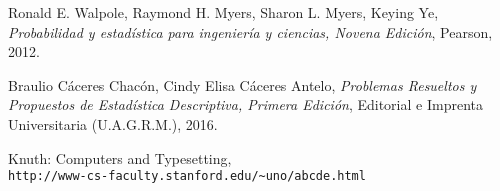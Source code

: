 

\begin{thebibliography}{9}
Ronald E. Walpole, Raymond H. Myers, Sharon L. Myers, Keying Ye, \textit{Probabilidad y estadística para ingeniería y ciencias, Novena Edición}, Pearson, 2012. 
 
Braulio Cáceres Chacón, Cindy Elisa Cáceres Antelo, \textit{Problemas Resueltos y Propuestos de Estadística Descriptiva, Primera Edición}, Editorial e Imprenta Universitaria (U.A.G.R.M.), 2016.

 
Knuth: Computers and Typesetting,
\\\texttt{http://www-cs-faculty.stanford.edu/\~{}uno/abcde.html}
\end{thebibliography}

